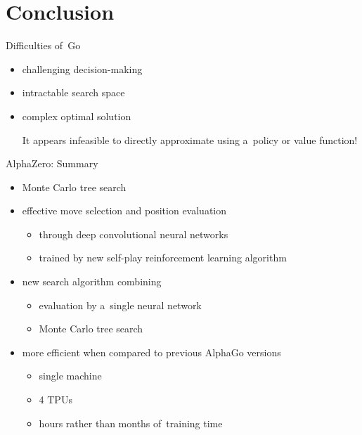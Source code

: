 \documentclass{beamer}
\begin{document}
  \section{Conclusion}

  {
    \begin{frame}{Difficulties of~Go}
      \begin{itemize}[<+- | alert@+>]
        \item challenging decision-making
        \item intractable search space
        \item complex optimal solution

          {\tiny It appears infeasible to directly approximate using a~policy or value function!}
      \end{itemize}
    \end{frame}

    \begin{frame}{AlphaZero: Summary}
      \begin{itemize}[<+- | alert@+>]
        \item Monte Carlo tree search
        \item effective move selection and position evaluation 
          \begin{itemize}[<+- | alert@+>]
            \item through deep convolutional neural networks
            \item trained by new self-play reinforcement learning algorithm
          \end{itemize}
        \item new search algorithm combining
          \begin{itemize}[<+- | alert@+>]
            \item evaluation by a~single neural network
            \item Monte Carlo tree search
          \end{itemize}
        \item more efficient when compared to previous AlphaGo versions
          \begin{itemize}[<+- | alert@+>]
            \item single machine
            \item 4 TPUs
            \item hours rather than months of~training time
          \end{itemize}
      \end{itemize}
    \end{frame}

}
\end{document}
